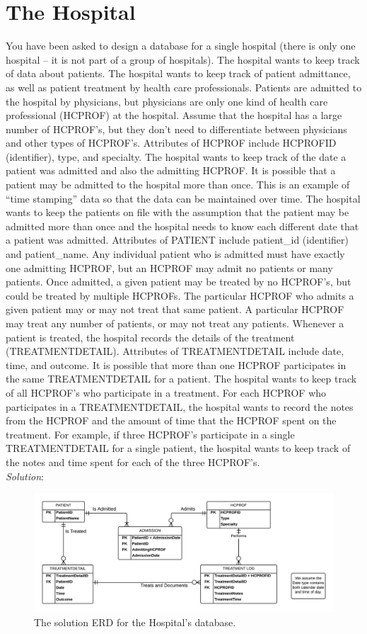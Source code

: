 \documentclass{article}
\begin{document}
\newpage
\section{The Hospital}

You have been asked to design a database for a single hospital (there is only one hospital – it is not part of a group of hospitals). The hospital wants to keep track of data about patients. The hospital wants to keep track of patient admittance, as well as patient treatment by health care professionals. Patients are admitted to the hospital by physicians, but physicians are only one kind of health care professional (HCPROF) at the hospital. Assume that the hospital has a large number of HCPROF’s, but they don’t need to differentiate between physicians and other types of HCPROF’s. Attributes of HCPROF include HCPROFID (identifier), type, and specialty. The hospital wants to keep track of the date a patient was admitted and also the admitting HCPROF. It is possible that a patient may be admitted to the hospital more than once. This is an example of “time stamping” data so that the data can be maintained over time. The hospital wants to keep the patients on file with the assumption that the patient may be admitted more than once and the hospital needs to know each different date that a patient was admitted. Attributes of PATIENT include patient\_id (identifier) and patient\_name. Any individual patient who is admitted must have exactly one admitting HCPROF, but an HCPROF may admit no patients or many patients. Once admitted, a given patient may be treated by no HCPROF’s, but could be treated by multiple HCPROFs. The particular HCPROF who admits a given patient may or may not treat that same patient. A particular HCPROF may treat any number of patients, or may not treat any patients. Whenever a patient is treated, the hospital records the details of the treatment (TREATMENTDETAIL). Attributes of TREATMENTDETAIL include date, time, and outcome. It is possible that more than one HCPROF participates in the same TREATMENTDETAIL for a patient. The hospital wants to keep track of all HCPROF’s who participate in a treatment. For each HCPROF who participates in a TREATMENTDETAIL, the hospital wants to record the notes from the HCPROF and the amount of time that the HCPROF spent on the treatment. For example, if three HCPROF’s participate in a single TREATMENTDETAIL for a single patient, the hospital wants to keep track of the notes and time spent for each of the three HCPROF’s.\\

\textit{Solution}:

  \begin{figure}[h]
    \centering
    \includegraphics[width=.9\linewidth]{HW02_03-ERD}
    \caption{The solution ERD for the Hospital's database.}
    \label{fig:hospital}
  \end{figure}
  
\end{document}
